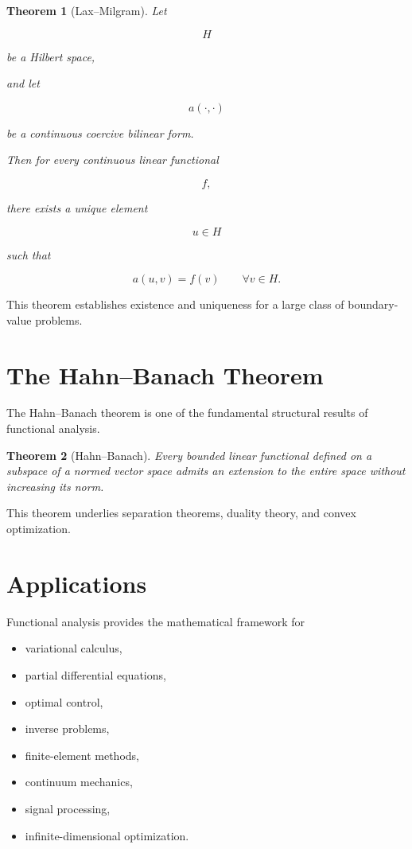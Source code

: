 \documentclass[11pt,fleqn]{book}
\numberwithin{equation}{chapter}
\theoremstyle{plain}
\newtheorem{theorem}{Theorem}[chapter]
\theoremstyle{definition}
\theoremstyle{remark}
\begin{document}
\begin{theorem}[Lax--Milgram]

Let

\[
H
\]

be a Hilbert space,

and let

\[
a(\cdot,\cdot)
\]

be a continuous coercive bilinear form.

Then for every continuous linear functional

\[
f,
\]

there exists a unique element

\[
u\in H
\]

such that

\[
\boxed{
a(u,v)
=
f(v)
\qquad
\forall v\in H.
}
\]

\end{theorem}

This theorem establishes existence and uniqueness for a large class of
boundary-value problems.


\section{The Hahn--Banach Theorem}

The Hahn--Banach theorem is one of the fundamental structural results of
functional analysis.

\begin{theorem}[Hahn--Banach]

Every bounded linear functional defined on a subspace of a normed vector
space admits an extension to the entire space without increasing its
norm.

\end{theorem}

This theorem underlies separation theorems, duality theory, and convex
optimization.


\section{Applications}

Functional analysis provides the mathematical framework for

\begin{itemize}
\item variational calculus,
\item partial differential equations,
\item optimal control,
\item inverse problems,
\item finite-element methods,
\item continuum mechanics,
\item signal processing,
\item infinite-dimensional optimization.
\end{itemize}
\end{document}
